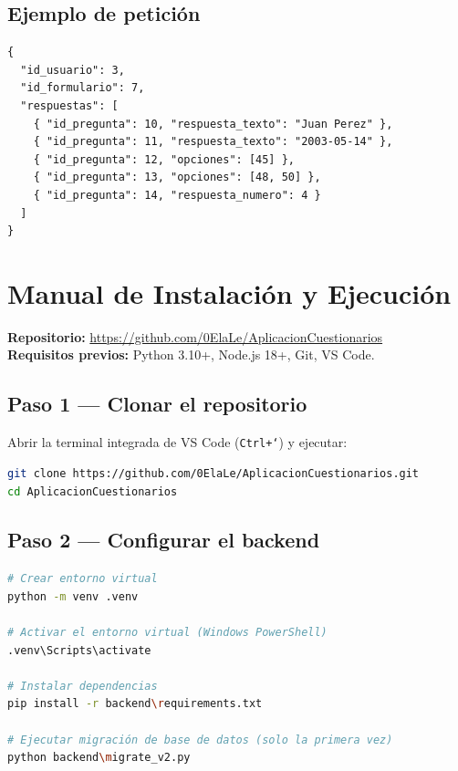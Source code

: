 \documentclass[12pt,a4paper]{article}
\begin{document}
\subsection{Ejemplo de petición}

\begin{lstlisting}[caption={Body JSON para POST /api/respuestas}]
{
  "id_usuario": 3,
  "id_formulario": 7,
  "respuestas": [
    { "id_pregunta": 10, "respuesta_texto": "Juan Perez" },
    { "id_pregunta": 11, "respuesta_texto": "2003-05-14" },
    { "id_pregunta": 12, "opciones": [45] },
    { "id_pregunta": 13, "opciones": [48, 50] },
    { "id_pregunta": 14, "respuesta_numero": 4 }
  ]
}
\end{lstlisting}

\section{Manual de Instalación y Ejecución}

\begin{nota}
\textbf{Repositorio:} \url{https://github.com/0ElaLe/AplicacionCuestionarios}\\
\textbf{Requisitos previos:} Python 3.10+, Node.js 18+, Git, VS Code.
\end{nota}

\subsection{Paso 1 — Clonar el repositorio}

Abrir la terminal integrada de VS Code (\texttt{Ctrl+`}) y ejecutar:

\begin{lstlisting}[language=bash]
git clone https://github.com/0ElaLe/AplicacionCuestionarios.git
cd AplicacionCuestionarios
\end{lstlisting}

\subsection{Paso 2 — Configurar el backend}

\begin{lstlisting}[language=bash]
# Crear entorno virtual
python -m venv .venv

# Activar el entorno virtual (Windows PowerShell)
.venv\Scripts\activate

# Instalar dependencias
pip install -r backend\requirements.txt

# Ejecutar migración de base de datos (solo la primera vez)
python backend\migrate_v2.py
\end{lstlisting}
\end{document}
